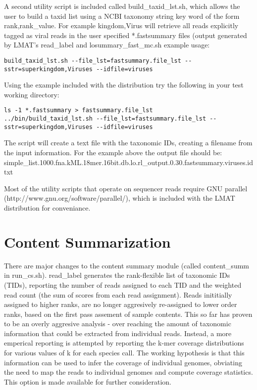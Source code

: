 \documentclass[11pt]{article}
\begin{document}
A second utility script is included called {build_taxid_lst.sh}, which allows the user to build a taxid list using a NCBI taxonomy string key word of the form rank,rank_value.
For example kingdom,Virus will retrieve all reads explicitly tagged as viral reads in the user specified *.fastsummary files (output generated by LMAT's {read_label} and {losummary_fast_mc.sh}
example usage:
\begin{verbatim}
build_taxid_lst.sh --file_lst=fastsummary.file_lst --sstr=superkingdom,Viruses --idfile=viruses
\end{verbatim}

Using the example included with the distribution try the following in your test working directory:
\begin{verbatim}
ls -1 *.fastsummary > fastsummary.file_lst
../bin/build_taxid_lst.sh --file_lst=fastsummary.file_lst --sstr=superkingdom,Viruses --idfile=viruses
\end{verbatim}

The script will create a text file with the taxonomic IDs, creating a filename from the input information. For the example above the output file should be:
simple_list.1000.fna.kML.18mer.16bit.db.lo.rl_output.0.30.fastsummary.viruses.idtxt




Most of the utility scripts that operate on sequencer reads require
GNU parallel (http://www.gnu.org/software/parallel/), which is included with the LMAT distribution for conveniance.

\section{Content Summarization}
There are major changes to the content summary module (called {content_summ} in
 {run_cs.sh}).  {read_label} generates the rank-flexible list of
 taxonomic IDs (TIDs), reporting the number of reads assigned to each
 TID and the weighted read count (the sum of scores from each read
 assignment). Reads inititially assigned to higher ranks, are no longer
aggresively re-assigned to lower order ranks, based on the first pass
assement of sample contents. This so far has proven to be an overly aggresive
analysis - over reaching the amount of taxonomic information that could be extracted from
individual reads. Instead, a more emperical reporting is attempted by reporting the
k-mer coverage distributions for various values of k for each species call.  The working
hypothesis is that this information can be used to infer the coverage of individual genomes,
obviating the need to map the reads to individual genomes and compute coverage statistics.
This option is made available for further consideration.
\end{document}
